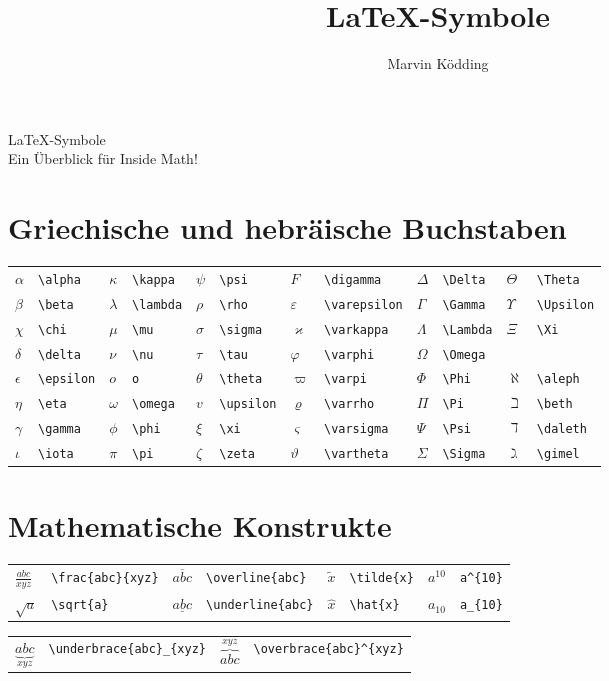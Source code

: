 \documentclass[11pt, a4paper]{article}
\title{\LaTeX-Symbole}
\author{Marvin Ködding}
\begin{document}
	\begin{center}
		{\Huge \LaTeX-Symbole\\\large Ein Überblick für Inside Math!}
	\end{center}
	
	\section{Griechische und hebräische Buchstaben}
	
	\begin{tabular}{llllllllllll}
		$\alpha$ & \verb|\alpha| & $\kappa$ & \verb|\kappa| & $\psi$ & \verb|\psi| & $F$ & \verb|\digamma| & $\Delta$ & \verb|\Delta| & $\Theta$ & \verb|\Theta| \\
		$\beta$ & \verb|\beta| & $\lambda$ & \verb|\lambda| & $\rho$ & \verb|\rho| & $\varepsilon$ & \verb|\varepsilon| & $\Gamma$ & \verb|\Gamma| & $\Upsilon$ & \verb|\Upsilon| \\
		$\chi$ & \verb|\chi| & $\mu$ & \verb|\mu| & $\sigma$ & \verb|\sigma| & $\varkappa$ & \verb|\varkappa| & $\Lambda$ & \verb|\Lambda| & $\Xi$ & \verb|\Xi| \\
		$\delta$ & \verb|\delta| & $\nu$ & \verb|\nu| & $\tau$ & \verb|\tau| & $\varphi$ & \verb|\varphi| & $\Omega$ & \verb|\Omega| & & \\
		$\epsilon$ & \verb|\epsilon| & $o$ & \verb|o| & $\theta$ & \verb|\theta| & $\varpi$ & \verb|\varpi| & $\Phi$ & \verb|\Phi| & $\aleph$ & \verb|\aleph| \\
		$\eta$ & \verb|\eta| & $\omega$ & \verb|\omega| & $v$ & \verb|\upsilon| & $\varrho$ & \verb|\varrho| & $\Pi$ & \verb|\Pi| & $\beth$ & \verb|\beth| \\
		$\gamma$ & \verb|\gamma| & $\phi$ & \verb|\phi| & $\xi$ & \verb|\xi| & $\varsigma$ & \verb|\varsigma| & $\Psi$ & \verb|\Psi| & $\daleth$ & \verb|\daleth| \\
		$\iota$ & \verb|\iota| & $\pi$ & \verb|\pi| & $\zeta$ & \verb|\zeta| & $\vartheta$ & \verb|\vartheta| & $\Sigma$ & \verb|\Sigma| & $\gimel$ & \verb|\gimel| \\
	\end{tabular}
	
	\section{Mathematische Konstrukte}
	
	\begin{center}
		\begin{tabular}{llllllll}
			$\frac{abc}{xyz}$ & \verb|\frac{abc}{xyz}| & $\overline{abc}$ & \verb|\overline{abc}| & $\tilde{x}$ & \verb|\tilde{x}| & $a^{10}$ & \verb*|a^{10}|\\
			$\sqrt{a}$ & \verb|\sqrt{a}| & $\underline{abc}$ & \verb|\underline{abc}| & $\hat{x}$ & \verb|\hat{x}|& $a_{10}$ & \verb*|a_{10}|
		\end{tabular}
		
		\begin{tabular}{llll}
			$\underbrace{abc}_{xyz}$ & \verb|\underbrace{abc}_{xyz}| & $\overbrace{abc}^{xyz}$ & \verb|\overbrace{abc}^{xyz}|
		\end{tabular}
	\end{center}
	
\end{document}
